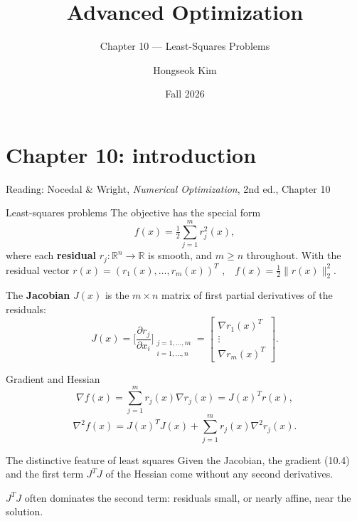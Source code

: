 \documentclass[aspectratio=169,12pt]{beamer}
\title{Advanced Optimization}
\subtitle{Chapter 10 --- Least-Squares Problems}
\author{Hongseok Kim}
\institute{Department of Electronic Engineering, Sogang University}
\date{Fall 2026}
\newcommand{\R}{\mathbb{R}}
\newcommand{\gradf}{\nabla f}
\newcommand{\hessf}{\nabla^{2} f}
\newcommand{\eqn}[1]{\text{\small(#1)}}
\begin{document}
\section{Chapter 10: introduction}

\begin{frame}
  \titlepage
  \begin{center}\small
    Reading: Nocedal \& Wright, \emph{Numerical Optimization}, 2nd ed., Chapter 10
  \end{center}
\end{frame}

\begin{frame}{Least-squares problems}
  The objective has the special form
  \[ f(x)=\tfrac12\sum_{j=1}^{m}r_{j}^{2}(x), \tag{10.1} \]
  where each \textbf{residual} $r_{j}:\R^{n}\to\R$ is smooth, and $m\ge n$ throughout.
  With the residual vector $r(x)=(r_{1}(x),\dots,r_{m}(x))^{T}$ \eqn{10.2},\ \ $f(x)=\tfrac12\|r(x)\|_{2}^{2}$.

  \vspace{0.2em}
  The \textbf{Jacobian} $J(x)$ is the $m\times n$ matrix of first partial derivatives of the residuals:
  \[
    J(x)=\Big[\frac{\partial r_{j}}{\partial x_{i}}\Big]_{\substack{j=1,\dots,m\\ i=1,\dots,n}}
    =\begin{bmatrix}\nabla r_{1}(x)^{T}\\ \vdots\\ \nabla r_{m}(x)^{T}\end{bmatrix} .
    \tag{10.3}
  \]
\end{frame}

\begin{frame}{Gradient and Hessian}
  \[ \gradf(x)=\sum_{j=1}^{m}r_{j}(x)\nabla r_{j}(x)=J(x)^{T}r(x), \tag{10.4} \]
  \[ \hessf(x)=J(x)^{T}J(x)+\sum_{j=1}^{m}r_{j}(x)\nabla^{2}r_{j}(x) . \tag{10.5} \]
  \vspace{-0.3em}
  \begin{block}{The distinctive feature of least squares}
    Given the Jacobian, the gradient (10.4) and the first term $J^{T}J$ of the Hessian
    come \alert{without any second derivatives}.
  \end{block}

  $J^{T}J$ often dominates the second term: residuals small, or nearly affine, near the solution.
\end{frame}
\end{document}
